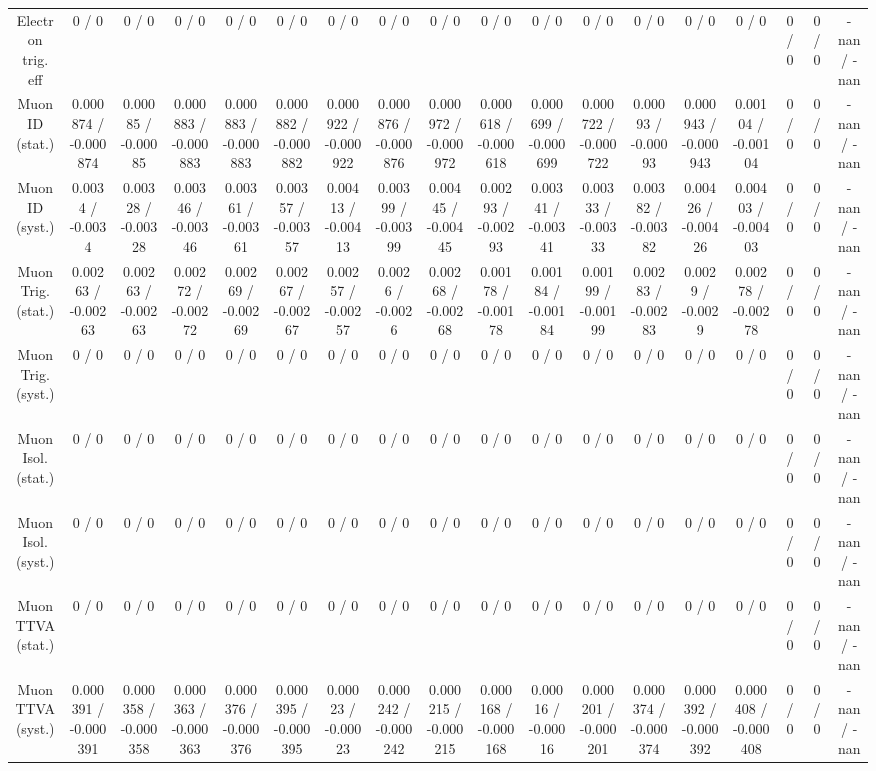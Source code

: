 \documentclass[10pt]{article}
\begin{document}
\begin{table}[htbp]
\begin{center}
\begin{tabular}{|c|c|c|c|c|c|c|c|c|c|c|c|c|c|c|c|c|c|}
  Electron trig. eff & 0 / 0 & 0 / 0 & 0 / 0 & 0 / 0 & 0 / 0 & 0 / 0 & 0 / 0 & 0 / 0 & 0 / 0 & 0 / 0 & 0 / 0 & 0 / 0 & 0 / 0 & 0 / 0 & 0 / 0 & 0 / 0 & -nan / -nan \\ 
  Muon ID (stat.) & 0.000874 / -0.000874 & 0.00085 / -0.00085 & 0.000883 / -0.000883 & 0.000883 / -0.000883 & 0.000882 / -0.000882 & 0.000922 / -0.000922 & 0.000876 / -0.000876 & 0.000972 / -0.000972 & 0.000618 / -0.000618 & 0.000699 / -0.000699 & 0.000722 / -0.000722 & 0.00093 / -0.00093 & 0.000943 / -0.000943 & 0.00104 / -0.00104 & 0 / 0 & 0 / 0 & -nan / -nan \\ 
  Muon ID (syst.) & 0.0034 / -0.0034 & 0.00328 / -0.00328 & 0.00346 / -0.00346 & 0.00361 / -0.00361 & 0.00357 / -0.00357 & 0.00413 / -0.00413 & 0.00399 / -0.00399 & 0.00445 / -0.00445 & 0.00293 / -0.00293 & 0.00341 / -0.00341 & 0.00333 / -0.00333 & 0.00382 / -0.00382 & 0.00426 / -0.00426 & 0.00403 / -0.00403 & 0 / 0 & 0 / 0 & -nan / -nan \\ 
  Muon Trig. (stat.) & 0.00263 / -0.00263 & 0.00263 / -0.00263 & 0.00272 / -0.00272 & 0.00269 / -0.00269 & 0.00267 / -0.00267 & 0.00257 / -0.00257 & 0.0026 / -0.0026 & 0.00268 / -0.00268 & 0.00178 / -0.00178 & 0.00184 / -0.00184 & 0.00199 / -0.00199 & 0.00283 / -0.00283 & 0.0029 / -0.0029 & 0.00278 / -0.00278 & 0 / 0 & 0 / 0 & -nan / -nan \\ 
  Muon Trig. (syst.) & 0 / 0 & 0 / 0 & 0 / 0 & 0 / 0 & 0 / 0 & 0 / 0 & 0 / 0 & 0 / 0 & 0 / 0 & 0 / 0 & 0 / 0 & 0 / 0 & 0 / 0 & 0 / 0 & 0 / 0 & 0 / 0 & -nan / -nan \\ 
  Muon Isol. (stat.) & 0 / 0 & 0 / 0 & 0 / 0 & 0 / 0 & 0 / 0 & 0 / 0 & 0 / 0 & 0 / 0 & 0 / 0 & 0 / 0 & 0 / 0 & 0 / 0 & 0 / 0 & 0 / 0 & 0 / 0 & 0 / 0 & -nan / -nan \\ 
  Muon Isol. (syst.) & 0 / 0 & 0 / 0 & 0 / 0 & 0 / 0 & 0 / 0 & 0 / 0 & 0 / 0 & 0 / 0 & 0 / 0 & 0 / 0 & 0 / 0 & 0 / 0 & 0 / 0 & 0 / 0 & 0 / 0 & 0 / 0 & -nan / -nan \\ 
  Muon TTVA (stat.) & 0 / 0 & 0 / 0 & 0 / 0 & 0 / 0 & 0 / 0 & 0 / 0 & 0 / 0 & 0 / 0 & 0 / 0 & 0 / 0 & 0 / 0 & 0 / 0 & 0 / 0 & 0 / 0 & 0 / 0 & 0 / 0 & -nan / -nan \\ 
  Muon TTVA (syst.) & 0.000391 / -0.000391 & 0.000358 / -0.000358 & 0.000363 / -0.000363 & 0.000376 / -0.000376 & 0.000395 / -0.000395 & 0.00023 / -0.00023 & 0.000242 / -0.000242 & 0.000215 / -0.000215 & 0.000168 / -0.000168 & 0.00016 / -0.00016 & 0.000201 / -0.000201 & 0.000374 / -0.000374 & 0.000392 / -0.000392 & 0.000408 / -0.000408 & 0 / 0 & 0 / 0 & -nan / -nan \\ 

\end{tabular}
\end{center}
\end{table}
\end{document}
